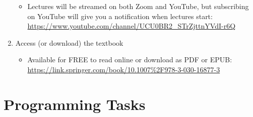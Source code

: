 \documentclass{lab}
\begin{document}
\begin{enumerate}
	\begin{itemize}
		\item Lectures will be streamed on both Zoom and YouTube, but subscribing on YouTube will give you a notification when lectures start: \url{https://www.youtube.com/channel/UCU0BR2_STrZjttnYVdI-r6Q}
	\end{itemize}
\item Access (or download) the textbook
	\begin{itemize}
		\item Available for FREE to read online or download as PDF or EPUB: \url{https://link.springer.com/book/10.1007%2F978-3-030-16877-3}
	\end{itemize}
\end{enumerate}

\section{Programming Tasks}
\end{document}
